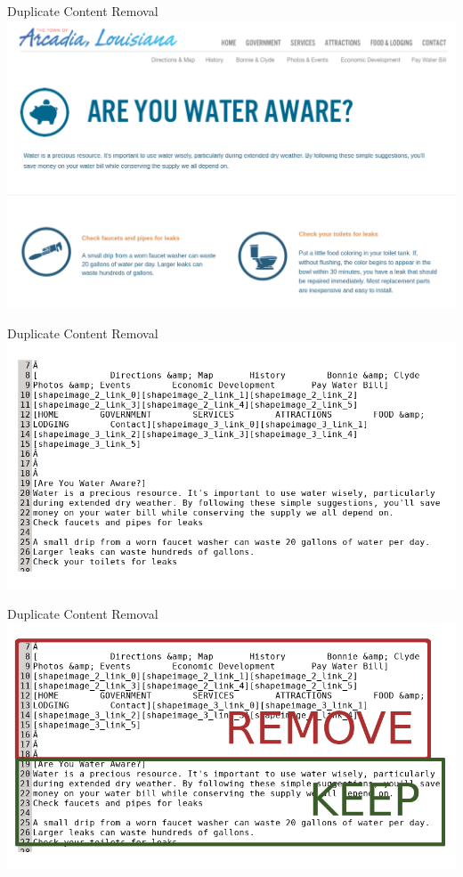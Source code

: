 \documentclass[12pt]{beamer}
\begin{document}
\begin{frame}{Duplicate Content Removal}
\includegraphics[width = \linewidth]{arcadia_water.png}
\end{frame}

\begin{frame}{Duplicate Content Removal}
\includegraphics[width = \linewidth]{duplicateLines.png}
\end{frame}

\begin{frame}{Duplicate Content Removal}
	\includegraphics[width = \linewidth]{duplicateLineRemoval.png}
\end{frame}
\end{document}
